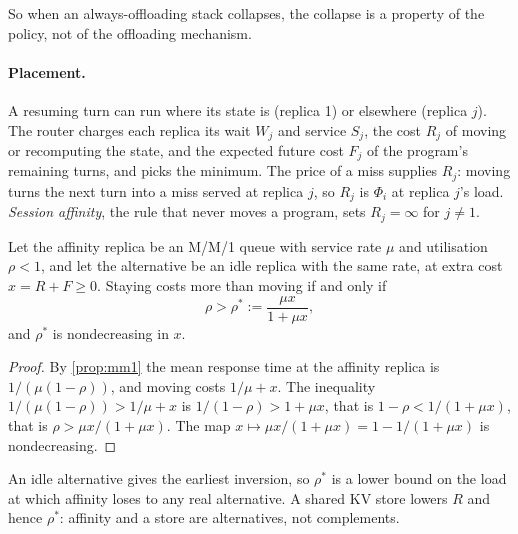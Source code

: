 So when an always-offloading stack collapses, the collapse is a property of
the policy, not of the offloading mechanism.

\paragraph{Placement.} A resuming turn can run where its state is (replica
1) or elsewhere (replica $j$). The router charges each replica its wait $W_j$
and service $S_j$, the cost $R_j$ of moving or recomputing the state, and
the expected future cost $F_j$ of the program's remaining turns, and picks
the minimum. The price of a miss supplies $R_j$: moving turns the next turn
into a miss served at replica $j$, so $R_j$ is $\Phi_i$ at replica $j$'s
load. \emph{Session affinity}, the rule that never moves a program, sets
$R_j=\infty$ for $j\ne1$.

\begin{proposition}\label{L5:prop:rhostar}
Let the affinity replica be an M/M/1 queue with service rate $\mu$ and
utilisation $\rho<1$, and let the alternative be an idle replica with the
same rate, at extra cost $x=R+F\ge0$. Staying costs more than moving if and
only if
\[
  \rho>\rho^*:=\frac{\mu x}{1+\mu x},
\]
and $\rho^*$ is nondecreasing in $x$.
\end{proposition}

\begin{proof}
By \cref{prop:mm1} the mean response time at the affinity replica is
$1/(\mu(1-\rho))$, and moving costs $1/\mu+x$. The inequality
$1/(\mu(1-\rho))>1/\mu+x$ is $1/(1-\rho)>1+\mu x$, that is
$1-\rho<1/(1+\mu x)$, that is $\rho>\mu x/(1+\mu x)$. The map
$x\mapsto\mu x/(1+\mu x)=1-1/(1+\mu x)$ is nondecreasing.
\end{proof}

An idle alternative gives the earliest inversion, so $\rho^*$ is a lower
bound on the load at which affinity loses to any real alternative. A shared
KV store lowers $R$ and hence $\rho^*$: affinity and a store are
alternatives, not complements.

